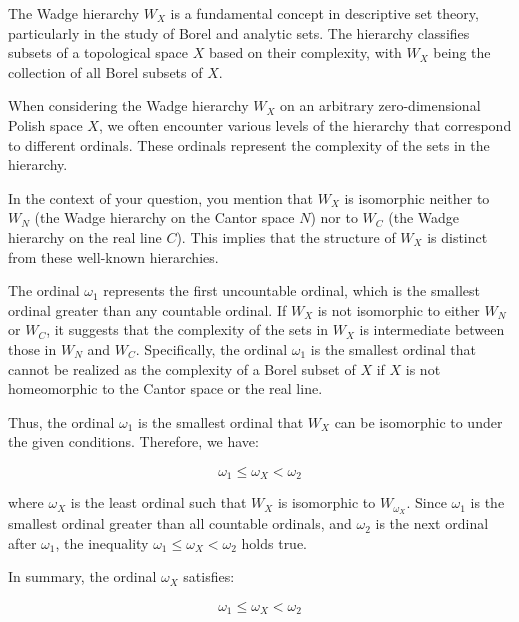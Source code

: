 The Wadge hierarchy \( W_X \) is a fundamental concept in descriptive set theory, particularly in the study of Borel and analytic sets. The hierarchy classifies subsets of a topological space \( X \) based on their complexity, with \( W_X \) being the collection of all Borel subsets of \( X \).

When considering the Wadge hierarchy \( W_X \) on an arbitrary zero-dimensional Polish space \( X \), we often encounter various levels of the hierarchy that correspond to different ordinals. These ordinals represent the complexity of the sets in the hierarchy.

In the context of your question, you mention that \( W_X \) is isomorphic neither to \( W_N \) (the Wadge hierarchy on the Cantor space \( N \)) nor to \( W_C \) (the Wadge hierarchy on the real line \( C \)). This implies that the structure of \( W_X \) is distinct from these well-known hierarchies.

The ordinal \( \omega_1 \) represents the first uncountable ordinal, which is the smallest ordinal greater than any countable ordinal. If \( W_X \) is not isomorphic to either \( W_N \) or \( W_C \), it suggests that the complexity of the sets in \( W_X \) is intermediate between those in \( W_N \) and \( W_C \). Specifically, the ordinal \( \omega_1 \) is the smallest ordinal that cannot be realized as the complexity of a Borel subset of \( X \) if \( X \) is not homeomorphic to the Cantor space or the real line.

Thus, the ordinal \( \omega_1 \) is the smallest ordinal that \( W_X \) can be isomorphic to under the given conditions. Therefore, we have:

\[
\omega_1 \leq \omega_X < \omega_2
\]

where \( \omega_X \) is the least ordinal such that \( W_X \) is isomorphic to \( W_{\omega_X} \). Since \( \omega_1 \) is the smallest ordinal greater than all countable ordinals, and \( \omega_2 \) is the next ordinal after \( \omega_1 \), the inequality \( \omega_1 \leq \omega_X < \omega_2 \) holds true.

In summary, the ordinal \( \omega_X \) satisfies:

\[
\omega_1 \leq \omega_X < \omega_2
\]